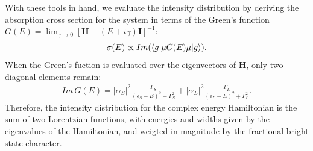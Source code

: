 \documentclass[12pt]{mitthesis}
\begin{document}
With these tools in hand, we evaluate the intensity distribution by
deriving the absorption cross section for the system in terms of the
Green's function $G(E) = \lim_{\gamma \rightarrow 0} \left [
  \mathbf{H} - (E+i \gamma) \mathbf{I} \right ]^{-1}$:
\begin{equation}
\sigma(E) \propto Im(\mathinner{\langle{g|\mu G(E) \mu|g}\rangle}).
\end{equation}
When the Green's fuction is evaluated over the eigenvectors of
$\mathbf{H}$, only two diagonal elements remain:
\begin{equation}
  \label{eq:greens-func}
  \begin{split}
    Im \, G(E) =
    \lvert \alpha_{S} \rvert^2
    \frac{\Gamma_{S}}
         {(\epsilon_{S} - E)^2 + \Gamma_{S}^2}
    + \lvert \alpha_{L} \rvert^2
    \frac{\Gamma_{L}}
         {(\epsilon_{L} - E)^2 + \Gamma_{L}^2}. 
  \end{split}
\end{equation}
Therefore, the intensity distribution for the complex energy
Hamiltonian is the sum of two Lorentzian functions, with energies and
widths given by the eigenvalues of the Hamiltonian, and weigted in
magnitude by the fractional bright state character.
\end{document}
